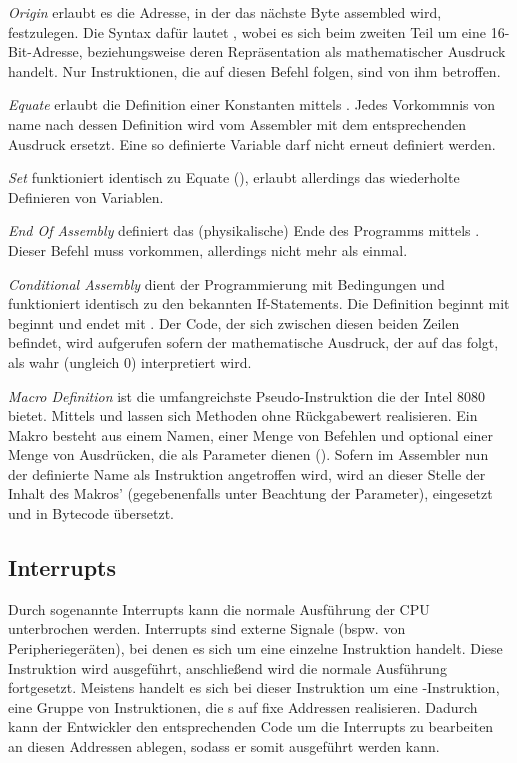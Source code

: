 \textit{Origin} erlaubt es die Adresse, in der das nächste Byte assembled wird, festzulegen. Die Syntax dafür lautet , wobei es sich beim zweiten Teil um eine 16-Bit-Adresse, beziehungsweise deren Repräsentation als mathematischer Ausdruck handelt. Nur Instruktionen, die auf diesen Befehl folgen, sind von ihm betroffen.

\textit{Equate} erlaubt die Definition einer Konstanten mittels . Jedes Vorkommnis von \glqq name\grqq{} nach dessen Definition wird vom Assembler mit dem entsprechenden Ausdruck ersetzt. Eine so definierte Variable darf nicht erneut definiert werden.

\textit{Set} funktioniert identisch zu Equate (), erlaubt allerdings das wiederholte Definieren von Variablen.

\textit{End Of Assembly} definiert das (physikalische) Ende des Programms mittels . Dieser Befehl muss vorkommen, allerdings nicht mehr als einmal.

\textit{Conditional Assembly} dient der Programmierung mit Bedingungen und funktioniert identisch zu den bekannten If-Statements. Die Definition beginnt mit  beginnt und endet mit . Der Code, der sich zwischen diesen beiden Zeilen befindet, wird aufgerufen sofern der mathematische Ausdruck, der auf das  folgt, als wahr (ungleich 0) interpretiert wird.

\textit{Macro Definition} ist die umfangreichste Pseudo-Instruktion die der Intel 8080 bietet. Mittels  und  lassen sich Methoden ohne Rückgabewert realisieren. Ein Makro besteht aus einem Namen, einer Menge von Befehlen und optional einer Menge von Ausdrücken, die als Parameter dienen (). Sofern im Assembler nun der definierte Name als Instruktion angetroffen wird, wird an dieser Stelle der Inhalt des Makros' (gegebenenfalls unter Beachtung der Parameter), eingesetzt und in Bytecode übersetzt.

\subsection{Interrupts}

Durch sogenannte Interrupts kann die normale Ausführung der CPU unterbrochen werden. Interrupts sind externe Signale (bspw. von Peripheriegeräten), bei denen es sich um eine einzelne Instruktion handelt. Diese Instruktion wird ausgeführt, anschließend wird die normale Ausführung fortgesetzt. Meistens handelt es sich bei dieser Instruktion um eine -Instruktion, eine Gruppe von Instruktionen, die s auf fixe Addressen realisieren. Dadurch kann der Entwickler den entsprechenden Code um die Interrupts zu bearbeiten an diesen Addressen ablegen, sodass er somit ausgeführt werden kann.

